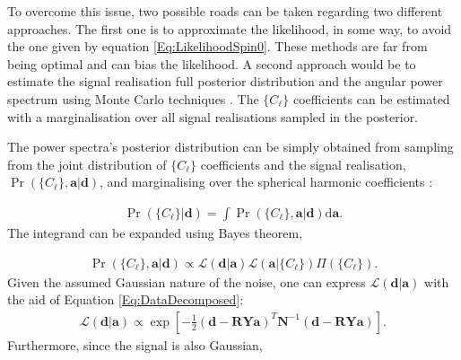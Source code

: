 \qquad To overcome this issue, two possible roads can be taken regarding two different approaches. The first one is to approximate the likelihood, in some way, to avoid the one given by equation \eqref{Eq:LikelihoodSpin0}. These methods are far from being optimal and can bias the likelihood. A second approach would be to estimate the signal realisation full posterior distribution and the angular power spectrum using Monte Carlo techniques \citep{Taylor2008,AlmostBlackPearl2016}. The $\{ C_{\ell}\}$ coefficients can be estimated with a marginalisation over all signal realisations sampled in the posterior. 

\qquad The power spectra's posterior distribution can be simply obtained from sampling from the joint distribution of $\{C_{\ell}\}$ coefficients and the signal realisation, $\Pr(\{C_{\ell}\},\mathbf{a}|\mathbf{d})$, and marginalising over the spherical harmonic coefficients \citep{Eriksen2004,Wandelt2004,Taylor2008,AlmostBlackPearl2016}:

\begin{align}
\Pr(\{C_{\ell}\}|\mathbf{d}) = \int\Pr(\{C_{\ell}\},\mathbf{a}|\mathbf{d})\text{d}\mathbf{a}.
\label{Eq:LikelihInt}
\end{align}
\noindent The integrand can be expanded using Bayes theorem,

\begin{align}
\Pr(\{C_{\ell}\},\mathbf{a}|\mathbf{d}) \propto \mathcal{L}(\mathbf{d}|\mathbf{a})\mathcal{L}(\mathbf{a}|\{C_{\ell}\})\Pi(\{C_{\ell}\}). 
\label{Eq:Posterior1}
\end{align}
\noindent Given the assumed Gaussian nature of the noise, one can express $\mathcal{L}(\mathbf{d}|\mathbf{a})$ with the aid of Equation \eqref{Eq:DataDecomposed}:
\begin{align}
\mathcal{L}(\mathbf{d}|\mathbf{a}) \propto \exp \left[ -\frac{1}{2} (\mathbf{d-RYa})^T \mathbf{N}^{-1}(\mathbf{d-RYa}) \right] .
\end{align}
\noindent Furthermore, since the signal is also Gaussian,

